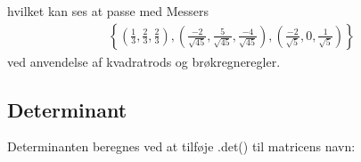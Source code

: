 \documentclass[letterpaper,10pt,english]{jupyterBook}
\begin{document}
\noindent{}

\begin{sphinxVerbatim}[commandchars=\\\{\}]
\end{sphinxVerbatim}

\noindent{}

\begin{sphinxVerbatim}[commandchars=\\\{\}]
 
\end{sphinxVerbatim}

\noindent{}

hvilket kan ses at passe med Messers
\begin{equation*}
\begin{split}\left\{ \left(\frac{1}{3}, \frac{2}{3}, \frac{2}{3}\right), \left(\frac{-2}{\sqrt{45}}, \frac{5}{\sqrt{45}}, \frac{-4}{\sqrt{45}}\right),\left(\frac{-2}{\sqrt{5}}, 0, \frac{1}{\sqrt{5}}\right)\right\}\end{split}
\end{equation*}
ved anvendelse af kvadratrods\sphinxhyphen{} og brøkregneregler.


\subsection{Determinant}
\label{\detokenize{notebooks/sympy/Notebook_LinAlg_2:determinant}}
Determinanten beregnes ved at tilføje .det() til matricens navn:

\begin{sphinxVerbatim}[commandchars=\\\{\}]
  \PYG{p}{[}\PYG{p}{[} \PYG{p}{]} \PYG{p}{[} \PYG{p}{]}\PYG{p}{]}
\end{sphinxVerbatim}

\noindent{}

\noindent{}
\end{document}
